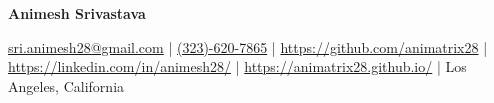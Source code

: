 \documentclass[10pt, legalpaper]{article}
\newenvironment{onecolentry}{
    \par\noindent
}{
    \par
}
\newenvironment{header}{
    \setlength{\topsep}{0pt}\par\kern\topsep\centering\linespread{1.5}
}{
    \par\kern\topsep
}
\begin{document}
\begin{header}
    \fontsize{21 pt}{21 pt}\selectfont \textbf{Animesh Srivastava}
\end{header}
\vspace{3 pt}
    

\begin{onecolentry}
    \centering
    \small
    \href{mailto:sri.animesh28@gmail.com}{sri.animesh28@gmail.com} \quad | \quad 
    \href{tel:+1-323-620-7865}{(323)-620-7865} \quad | \quad 
    \href{https://github.com/animatrix28}{https://github.com/animatrix28} \quad | \quad 
    \href{https://www.linkedin.com/in/animesh28/}{https://linkedin.com/in/animesh28/} \quad | \quad 
    \href{https://animatrix28.github.io/}{https://animatrix28.github.io/} \quad | \quad
    Los Angeles, California
\end{onecolentry}


\vspace{-2 pt}

\end{document}
